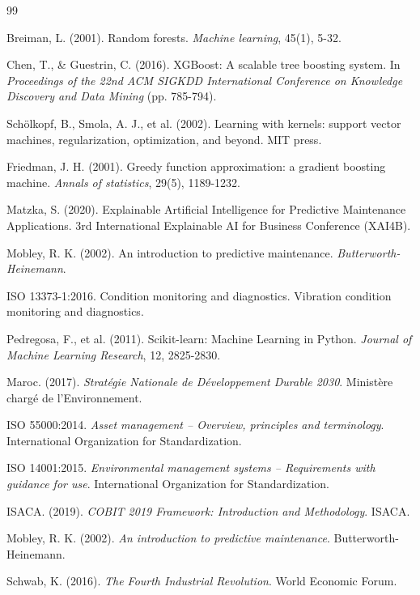 \documentclass[a4paper,12pt]{report}
\begin{document}
\begin{thebibliography}{99}

 Breiman, L. (2001). Random forests. \textit{Machine learning}, 45(1), 5-32.

 Chen, T., \& Guestrin, C. (2016). XGBoost: A scalable tree boosting system. In \textit{Proceedings of the 22nd ACM SIGKDD International Conference on Knowledge Discovery and Data Mining} (pp. 785-794).

 Schölkopf, B., Smola, A. J., et al. (2002). Learning with kernels: support vector machines, regularization, optimization, and beyond. MIT press.

 Friedman, J. H. (2001). Greedy function approximation: a gradient boosting machine. \textit{Annals of statistics}, 29(5), 1189-1232.

 Matzka, S. (2020). Explainable Artificial Intelligence for Predictive Maintenance Applications. 3rd International Explainable AI for Business Conference (XAI4B).

 Mobley, R. K. (2002). An introduction to predictive maintenance. \textit{Butterworth-Heinemann}.

 ISO 13373-1:2016. Condition monitoring and diagnostics. Vibration condition monitoring and diagnostics.

 Pedregosa, F., et al. (2011). Scikit-learn: Machine Learning in Python. \textit{Journal of Machine Learning Research}, 12, 2825-2830.


 Maroc. (2017). \textit{Stratégie Nationale de Développement Durable 2030}. Ministère chargé de l'Environnement.

 ISO 55000:2014. \textit{Asset management -- Overview, principles and terminology}. International Organization for Standardization.

 ISO 14001:2015. \textit{Environmental management systems -- Requirements with guidance for use}. International Organization for Standardization.

 ISACA. (2019). \textit{COBIT 2019 Framework: Introduction and Methodology}. ISACA.

 Mobley, R. K. (2002). \textit{An introduction to predictive maintenance}. Butterworth-Heinemann.

 Schwab, K. (2016). \textit{The Fourth Industrial Revolution}. World Economic Forum.

\end{thebibliography}
\end{document}
